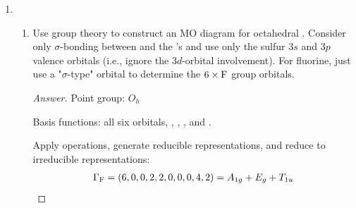 \documentclass[../psets.tex]{subfiles}
\begin{document}
\begin{enumerate}[label={\Roman*)}]
\begin{enumerate}[label={\alph*)}]
\begin{proof}
            We can determine that $\Gamma_\nu=(3,0,1)$ by counting how many $\overrightarrow{\ce{N-H}}$ vectors stay the same under each symmetry operation. We can decompose this by inspection to $\Gamma_\nu=A_1+E$. Thus, we have by subtraction that $\Gamma_\delta=A_1+E$.\par\smallskip
            For planar , we can determine that $\Gamma_{x,y,z}=(3,0,-1,1,-2,1)$. We can also figure out that the number of atoms unmoved after applying each symmetry operation is $(4,1,2,4,1,2)$. Thus, $\Gamma_{3N}=(12,0,-2,4,-2,2)$. We can decompose this by repeated applications of the reduction formula to $\Gamma_{3N}=A_1'+A_2'+3E'+2A_2''+E''$. Since $\Gamma_\text{trans}=E'+A_2''$ and $\Gamma_\text{rot}=A_2'+E''$, we have by subtraction that $\Gamma_\text{vibs}=A_1'+2E'+A_2''$.\par
            We can determine that $\Gamma_\nu=(3,0,1,3,0,1)$ by counting how many $\overrightarrow{\ce{N-H}}$ vectors stay the same under each symmetry operation. We can decompose this by inspection to $\Gamma_\nu=A_1'+E'$. Thus, we have by subtraction that $\Gamma_\delta=E'+A_2''$.\par\medskip
            Since the $E$ pyramidal bending modes transform into the analogous $E'$ planar bending modes, but the $A_1$ pyramidal bending mode has no planar analogue, it is the $A_1$ bending mode in pyramidal  that causes the inversion.
        \end{proof}
    \end{enumerate}
    \newpage
    \item ${\color{white}x}$
    \begin{enumerate}[label={\alph*)}]
        \item Use group theory to construct an MO diagram for octahedral . Consider only $\sigma$-bonding between  and the 's and use only the sulfur $3s$ and $3p$ valence orbitals (i.e., ignore the $3d$-orbital involvement). For fluorine, just use a "$\sigma$-type" orbital to determine the $6\times\ce{F}$ group orbitals.
        \begin{proof}[Answer]
            Point group: $O_h$\par
            Basis functions: all six  orbitals, , , , and .\par
            Apply operations, generate reducible representations, and reduce to irreducible representations:
            \begin{align*}
                \Gamma_{\ce{F}} &= (6,0,0,2,2,0,0,0,4,2) = A_{1g}+E_g+T_{1u}\\

\end{align*}
\end{proof}
\end{enumerate}
\end{enumerate}
\end{document}
